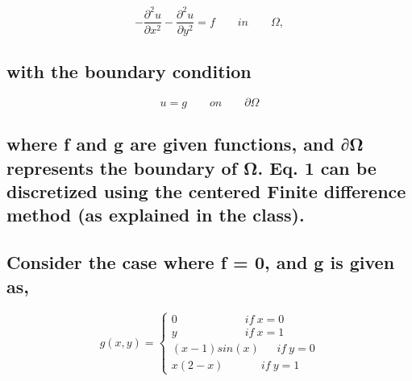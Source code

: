\documentclass[11pt]{article}
\begin{document}
    \[-\frac{\partial^2 u}{\partial x^2 } -\frac{\partial^2 u}{\partial y^2 } = f\qquad in \qquad \Omega, \tag{1}\]

    \hypertarget{with-the-boundary-condition}{%
\subsection{with the boundary
condition}\label{with-the-boundary-condition}}

\[u = g \qquad on \qquad \partial \Omega \tag{2}\]

    \hypertarget{where-f-and-g-are-given-functions-and-ux3c9-represents-the-boundary-of-ux3c9.-eq.-1-can-be-discretized-using-the-centered-finite-difference-method-as-explained-in-the-class.}{%
\subsection{where f and g are given functions, and ∂Ω represents the
boundary of Ω. Eq. 1 can be discretized using the centered Finite
difference method (as explained in the
class).}\label{where-f-and-g-are-given-functions-and-ux3c9-represents-the-boundary-of-ux3c9.-eq.-1-can-be-discretized-using-the-centered-finite-difference-method-as-explained-in-the-class.}}

    \hypertarget{consider-the-case-where-f-0-and-g-is-given-as}{%
\subsection{Consider the case where f = 0, and g is given
as,}\label{consider-the-case-where-f-0-and-g-is-given-as}}

    \[g(x,y) = \begin{cases}
0 \qquad\qquad\qquad if\:x = 0
\\
y \qquad\qquad\qquad if\:x = 1
\\
(x-1)sin(x) \:\:\:\:\:\:\: if\:y = 0
\\
x(2-x) \qquad\:\:\:\:\:\: if\:y = 1
\end{cases}\]
\end{document}
